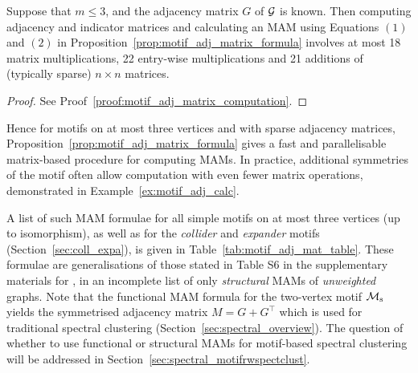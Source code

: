 \begin{proposition} \label{prop:motif_adj_matrix_computation}
Suppose that ${m \leq 3}$, and the adjacency matrix $G$ of $\mathcal{G}$ is known.
Then computing adjacency and indicator matrices and calculating an MAM using Equations $(1)$ and $(2)$ in Proposition~\ref{prop:motif_adj_matrix_formula} involves at most 18 matrix multiplications, 22 entry-wise multiplications and 21 additions of (typically sparse) $n \times n$ matrices.
\end{proposition}

\begin{proof}
See Proof~\ref{proof:motif_adj_matrix_computation}.
\end{proof}


Hence for motifs on at most three vertices and with sparse adjacency matrices, Proposition~\ref{prop:motif_adj_matrix_formula} gives a fast and parallelisable matrix-based procedure for computing MAMs. In practice, additional symmetries of the motif often allow computation with even fewer matrix operations, demonstrated in Example~\ref{ex:motif_adj_calc}.

A list of such MAM formulae for all simple motifs on at most three vertices (up to isomorphism), as well as for the \emph{collider} and \emph{expander} motifs (Section~\ref{sec:coll_expa}), is given in Table~\ref{tab:motif_adj_mat_table}. These formulae are generalisations of those stated in Table S6 in the supplementary materials for \cite{benson2016higher}, in an incomplete list of only \emph{structural} MAMs of \emph{unweighted} graphs. Note that the functional MAM formula for the two-vertex motif $\mathcal{M}_\mathrm{s}$ yields the symmetrised adjacency matrix $M = G + G^\top$ which is used for traditional spectral clustering (Section~\ref{sec:spectral_overview}). The question of whether to use functional or structural MAMs for motif-based spectral clustering will be addressed in Section~\ref{sec:spectral_motifrwspectclust}.

